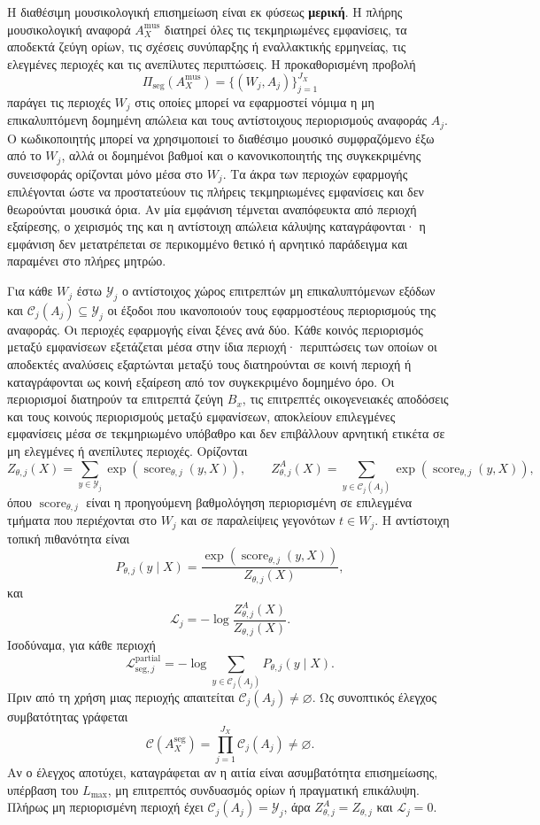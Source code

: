 \documentclass[11pt,a4paper]{article}
\begin{document}
Η διαθέσιμη μουσικολογική επισημείωση είναι εκ φύσεως \textbf{μερική}. Η πλήρης μουσικολογική αναφορά $A_X^{\mathrm{mus}}$ διατηρεί όλες τις τεκμηριωμένες εμφανίσεις, τα αποδεκτά ζεύγη ορίων, τις σχέσεις συνύπαρξης ή εναλλακτικής ερμηνείας, τις ελεγμένες περιοχές και τις ανεπίλυτες περιπτώσεις. Η προκαθορισμένη προβολή
\[
\Pi_{\mathrm{seg}}(A_X^{\mathrm{mus}})
=\{(W_j,A_j)\}_{j=1}^{J_X}
\]
παράγει τις περιοχές $W_j$ στις οποίες μπορεί να εφαρμοστεί νόμιμα η μη επικαλυπτόμενη δομημένη απώλεια και τους αντίστοιχους περιορισμούς αναφοράς $A_j$. Ο κωδικοποιητής μπορεί να χρησιμοποιεί το διαθέσιμο μουσικό συμφραζόμενο έξω από το $W_j$, αλλά οι δομημένοι βαθμοί και ο κανονικοποιητής της συγκεκριμένης συνεισφοράς ορίζονται μόνο μέσα στο $W_j$. Τα άκρα των περιοχών εφαρμογής επιλέγονται ώστε να προστατεύουν τις πλήρεις τεκμηριωμένες εμφανίσεις και δεν θεωρούνται μουσικά όρια. Αν μία εμφάνιση τέμνεται αναπόφευκτα από περιοχή εξαίρεσης, ο χειρισμός της και η αντίστοιχη απώλεια κάλυψης καταγράφονται· η εμφάνιση δεν μετατρέπεται σε περικομμένο θετικό ή αρνητικό παράδειγμα και παραμένει στο πλήρες μητρώο.

Για κάθε $W_j$ έστω $\mathcal Y_j$ ο αντίστοιχος χώρος επιτρεπτών μη επικαλυπτόμενων εξόδων και $\mathcal C_j(A_j)\subseteq\mathcal Y_j$ οι έξοδοι που ικανοποιούν τους εφαρμοστέους περιορισμούς της αναφοράς. Οι περιοχές εφαρμογής είναι ξένες ανά δύο. Κάθε κοινός περιορισμός μεταξύ εμφανίσεων εξετάζεται μέσα στην ίδια περιοχή· περιπτώσεις των οποίων οι αποδεκτές αναλύσεις εξαρτώνται μεταξύ τους διατηρούνται σε κοινή περιοχή ή καταγράφονται ως κοινή εξαίρεση από τον συγκεκριμένο δομημένο όρο. Οι περιορισμοί διατηρούν τα επιτρεπτά ζεύγη $B_x$, τις επιτρεπτές οικογενειακές αποδόσεις και τους κοινούς περιορισμούς μεταξύ εμφανίσεων, αποκλείουν επιλεγμένες εμφανίσεις μέσα σε τεκμηριωμένο υπόβαθρο και δεν επιβάλλουν αρνητική ετικέτα σε μη ελεγμένες ή ανεπίλυτες περιοχές. Ορίζονται
\[
Z_{\theta,j}(X)=
\sum_{y\in\mathcal Y_j}
\exp\!\left(\operatorname{score}_{\theta,j}(y,X)\right),
\qquad
Z_{\theta,j}^{A}(X)=
\sum_{y\in\mathcal C_j(A_j)}
\exp\!\left(\operatorname{score}_{\theta,j}(y,X)\right),
\]
όπου $\operatorname{score}_{\theta,j}$ είναι η προηγούμενη βαθμολόγηση περιορισμένη σε επιλεγμένα τμήματα που περιέχονται στο $W_j$ και σε παραλείψεις γεγονότων $t\in W_j$. Η αντίστοιχη τοπική πιθανότητα είναι
\[
P_{\theta,j}(y\mid X)=
\frac{\exp\!\left(\operatorname{score}_{\theta,j}(y,X)\right)}
{Z_{\theta,j}(X)},
\]
και
\[
\mathcal L_j
=-\log\frac{Z_{\theta,j}^{A}(X)}{Z_{\theta,j}(X)}.
\]
Ισοδύναμα, για κάθε περιοχή
\[
\mathcal L_{\mathrm{seg},j}^{\mathrm{partial}}
=-\log\!\sum_{y\in\mathcal C_j(A_j)}P_{\theta,j}(y\mid X).
\]
Πριν από τη χρήση μιας περιοχής απαιτείται $\mathcal C_j(A_j)\neq\varnothing$. Ως συνοπτικός έλεγχος συμβατότητας γράφεται
\[
\mathcal C(A_X^{\mathrm{seg}})
=\prod_{j=1}^{J_X}\mathcal C_j(A_j)\neq\varnothing.
\]
Αν ο έλεγχος αποτύχει, καταγράφεται αν η αιτία είναι ασυμβατότητα επισημείωσης, υπέρβαση του $L_{\max}$, μη επιτρεπτός συνδυασμός ορίων ή πραγματική επικάλυψη. Πλήρως μη περιορισμένη περιοχή έχει $\mathcal C_j(A_j)=\mathcal Y_j$, άρα $Z_{\theta,j}^{A}=Z_{\theta,j}$ και $\mathcal L_j=0$.
\end{document}
